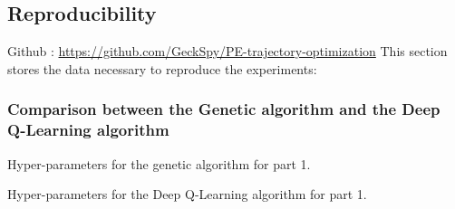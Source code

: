 \documentclass[11pt,a4paper]{article}
\begin{document}
\subsection*{Reproducibility}
Github : \url{https://github.com/GeckSpy/PE-trajectory-optimization}
This section stores the data necessary to reproduce the experiments: \subsubsection*{Comparison between the Genetic algorithm and the Deep Q-Learning algorithm}
Hyper-parameters for the genetic algorithm for part 1.
\begin{mybox}
    \tiny{
}
\end{mybox}
\label{Hyperparameters}
Hyper-parameters for the Deep Q-Learning algorithm for part 1.
\begin{mybox}
    \tiny{
}
\end{mybox}
\end{document}
